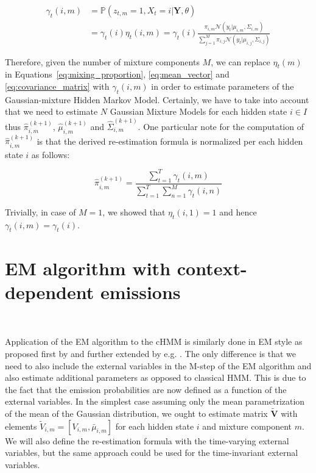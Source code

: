 \begin{align}
    \gamma_t(i,m) &= \mathbb{P}(z_{t,m} = 1, X_t = i|\textbf{Y},\theta) \\
    &= \gamma_t(i) \eta_t(i,m) = \gamma_t(i) \frac{\pi_{i,m} \mathcal{N}(y_t|\mu_{i,m},\Sigma_{i,m})}{\sum_{j=1}^{M} \pi_{i,j} \mathcal{N}(y_t|\mu_{i,j},\Sigma_{i,j})}
\end{align}

Therefore, given the number of mixture components $M$, we can replace $\eta_t(m)$ in Equations~\ref{eq:mixing_proportion}, \ref{eq:mean_vector} and \ref{eq:covariance_matrix} 
with $\gamma_t(i,m)$ in order to estimate parameters of the Gaussian-mixture Hidden Markov Model. Certainly, we have to take into account that we need to estimate $N$ Gaussian Mixture Models
for each hidden state $i \in I$ thus $\hat{\pi}_{i,m}^{(k+1)}$, $\hat{\mu}_{i,m}^{(k+1)}$ and $\hat{\Sigma}_{i,m}^{(k+1)}$. One particular note for the computation of $\hat{\pi}_{i,m}^{(k+1)}$ is 
that the derived re-estimation formula is normalized per each hidden state $i$ as follows:

\begin{equation}
    \hat{\pi}_{i,m}^{(k+1)} = \frac{\sum_{t=1}^{T} \gamma_t(i,m)}{\sum_{t=1}^{T} \sum_{n=1}^{M} \gamma_t(i,n)}
\end{equation}

\noindent Trivially, in case of $M = 1$, we showed that $\eta_t(i,1) = 1$ and hence $\gamma_t(i,m) = \gamma_t(i)$. 

\section{EM algorithm with context-dependent emissions}~\label{sec:EM-cHMM}

Application of the EM algorithm to the cHMM is similarly done in EM style as proposed first by \citep{Bobick1999} and further extended by e.g. \citep{Radenen2014}. 
The only difference is that we need to also include the external variables in the 
M-step of the EM algorithm and also estimate additional parameters as opposed to classical HMM. This is due to the fact that the emission probabilities
are now defined as a function of the external variables. In the simplest case assuming only the mean parametrization of the mean of the Gaussian distribution,
we ought to estimate matrix $\tilde{\textbf{V}}$ with elements $\tilde{V}_{i,m} = [V_{i,m},\bar{\mu}_{i,m}]$ for each hidden state $i$ and mixture component $m$. We will also define the re-estimation formula 
with the time-varying external variables, but the same approach could be used for the time-invariant external variables. \citep{Radenen2014}

